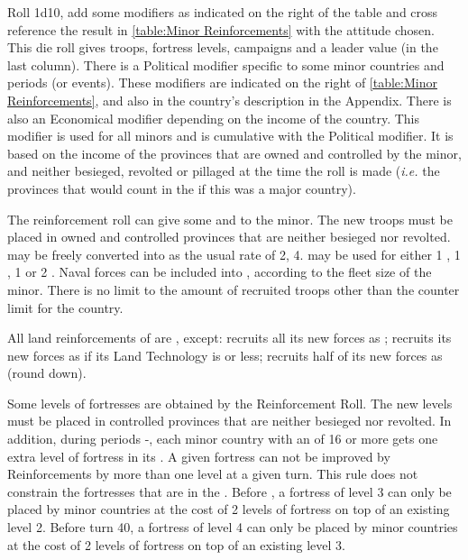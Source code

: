 
\bparag Roll 1d10, add some modifiers as indicated on the right of the table
and cross reference the result in \ref{table:Minor Reinforcements} with the
attitude chosen.
\bparag This die roll gives troops, fortress levels, campaigns and a leader
value (in the last column).
\bparag[Political] There is a Political modifier specific to some minor
countries and periods (or events). These modifiers are indicated on the right
of \ref{table:Minor Reinforcements}, and also in the country's description in
the Appendix.
\bparag[Incomes] There is also an Economical modifier depending on the income
of the country. This modifier is used for all minors and is cumulative with
the Political modifier. It is based on the income of the provinces that are
owned and controlled by the minor, and neither besieged, revolted or pillaged
at the time the roll is made (\emph{i.e.} the provinces that would count in
the  if this was a major country).

\aparag[Troops]
\bparag The reinforcement roll can give some \LD and \ND to the minor. The new
troops must be placed in owned and controlled provinces that are neither
besieged nor revolted.
\bparag \LD may be freely converted into \ARMY as the usual rate of
2\ARMY\facemoins, 4\ARMY\faceplus.
\bparag \ND may be used for either 1 \NWD, 1 \NTD, 1 \VGD or 2 \NGD.
\bparag Naval forces can be included into \FLEET, according to the fleet size
of the minor.
\bparag There is no limit to the amount of recruited troops other than the
counter limit for the country.

\aparag[Moral]
\bparag All land reinforcements of \MIN are , except:
\bparag \paysSuede recruits all its new forces as ;
\bparag \paysSuisse recruits its new forces as  if its Land
Technology is \TMUS or less;
\bparag \paysPerse recruits half of its new forces as  (round
down).

\aparag[Fortresses.] Some levels of fortresses are obtained by the
Reinforcement Roll. The new levels must be placed in controlled provinces that
are neither besieged nor revolted.
\bparag In addition, during periods -, each minor
country with an  of 16 or more gets one extra level of fortress
in its .
\bparag A given fortress can not be improved by Reinforcements by more than
one level at a given turn. This rule does not constrain the fortresses that
are in the .
\bparag Before \TARQ, a fortress of level 3 can only be placed by minor
countries at the cost of 2 levels of fortress on top of an existing level 2.
\bparag Before turn 40, a fortress of level 4 can only be placed by minor
countries at the cost of 2 levels of fortress on top of an existing level 3.

